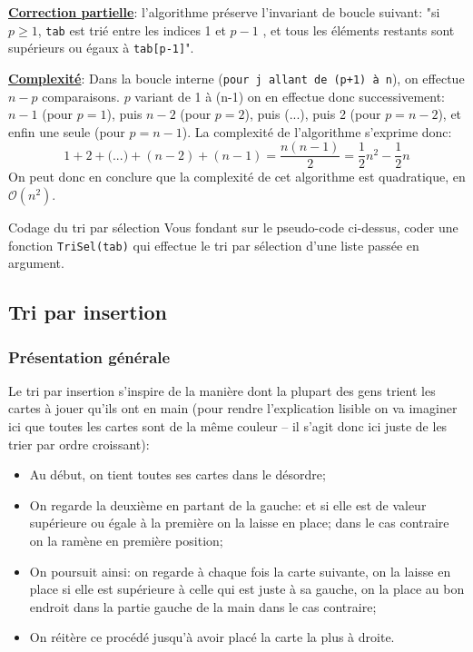 \documentclass[12pt]{article}
\begin{document}
	\textbf{\uline{Correction partielle}}: l'algorithme préserve l'invariant de boucle suivant: "si $p \geq 1$, \texttt{tab} est trié entre les indices 1 et $p - 1$ , et tous les éléments restants sont supérieurs ou égaux à \texttt{tab[p-1]}".
	
	\textbf{\uline{Complexité}}: Dans la boucle interne (\texttt{pour j allant de (p+1) à n}), on effectue $n - p$ comparaisons. $p$ variant de 1 à (n-1) on en effectue donc successivement: $n-1$ (pour $p = 1$), puis $n-2$ (pour $p = 2$), puis (...), puis 2 (pour $p = n-2$), et enfin une seule (pour $p = n-1$). La complexité de l'algorithme s'exprime donc:
	\[
	1 + 2 + \text{(...)} + (n-2) + (n-1) = \frac{n(n-1)}{2} = \frac{1}{2}n^2 - \frac{1}{2}n
	\]
	On peut donc en conclure que la complexité de cet algorithme est quadratique, en $\mathcal{O}(n^2)$.
	
	\begin{MonExo}{Codage du tri par sélection}
		Vous fondant sur le pseudo-code ci-dessus, coder une fonction \texttt{TriSel(tab)} qui effectue le tri par sélection d'une liste passée en argument.
	\end{MonExo}
	\begin{MaReponse}
	\end{MaReponse}
	
	\subsection{Tri par insertion}
	\subsubsection*{Présentation générale}
	Le tri par insertion s'inspire de la manière dont la plupart des gens trient les cartes à jouer qu'ils ont en main (pour rendre l'explication lisible on va imaginer ici que toutes les cartes sont de la même couleur -- il s'agit donc ici juste de les trier par ordre croissant):
	\begin{itemize}
		\item Au début, on tient toutes ses cartes dans le désordre;
		\item On regarde la deuxième en partant de la gauche: et si elle est de valeur supérieure ou égale à la première on la laisse en place; dans le cas contraire on la ramène en première position;
		\item On poursuit ainsi: on regarde à chaque fois la carte suivante, on la laisse en place si elle est supérieure à celle qui est juste à sa gauche, on la place au bon endroit dans la partie gauche de la main dans le cas contraire;
		\item On réitère ce procédé jusqu'à avoir placé la carte la plus à droite.
	\end{itemize}
	
\end{document}

